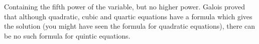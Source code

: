 Containing the fifth power of the variable, but no higher power.
Galois proved that although quadratic, cubic and quartic equations
have a formula which gives the solution (you might have seen the
formula for quadratic equations), there can be no such formula
for quintic equations.